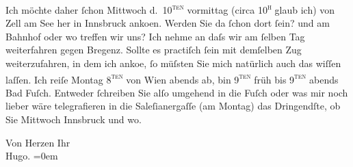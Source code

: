 \pstart
           {\pb}Ich möchte daher{ }ſchon
                  Mittwoch d. 10\textsc{\textsuperscript{ten}} vormittag (circa 10\textsc{\textsuperscript{h}} glaub ich) von Zell am See her in Innsbruck anko{\geminationm}en.
               Werden Sie da{ }ſchon dort{ }ſein? und am Bahnhof oder wo treffen wir uns? Ich nehme an daſs wir am{ }ſelben Tag weiterfahren gegen Bregenz. Sollte
               es practiſch{ }ſein mit demſelben {\pb}Zug weiterzufahren, in dem ich anko{\geminationm}e,{ }ſo müſsten Sie
               mich natürlich auch das wiſſen laſſen. Ich reiſe Montag 8\textsc{\textsuperscript{ten}} von Wien abends ab, bin 9\textsc{\textsuperscript{ten}}{ }früh bis 9\textsc{\textsuperscript{ten}}{ }abends{ }Bad Fuſch. Entweder{ }ſchreiben Sie alſo umgehend
               in die Fuſch oder was mir noch lieber wäre {\pb}telegrafieren in die Saleſianergaſſe (am Montag) das
               Dringendſte, ob Sie Mittwoch{ }Innsbruck und wo.\pend
           
\pstart
           Von Herzen Ihr{\\[\baselineskip]}\spacefill\mbox{Hugo.}\pend
           \leftskip=0em{}\endnumbering{}  \newcommand{\dateiname}{L00831}\newcommand{\titel}{Hugo von Hofmannsthal an Arthur Schnitzler, 6. 8. [1898]}\newcommand{\editorInnen}{Martin Anton Müller und Gerd-Hermann Susen}

